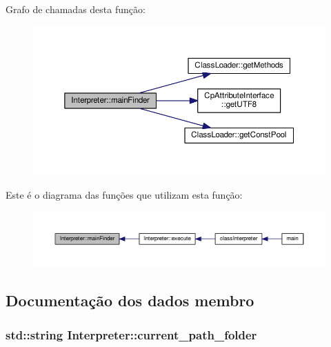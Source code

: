 Grafo de chamadas desta função\+:
\nopagebreak
\begin{figure}[H]
\begin{center}
\leavevmode
\includegraphics[width=350pt]{class_interpreter_a9be1f0faf7df7c81dc180da22ea08fa5_cgraph}
\end{center}
\end{figure}




Este é o diagrama das funções que utilizam esta função\+:
\nopagebreak
\begin{figure}[H]
\begin{center}
\leavevmode
\includegraphics[width=350pt]{class_interpreter_a9be1f0faf7df7c81dc180da22ea08fa5_icgraph}
\end{center}
\end{figure}




\subsection{Documentação dos dados membro}
\subsubsection[{\texorpdfstring{current\+\_\+path\+\_\+folder}{current_path_folder}}]{\setlength{\rightskip}{0pt plus 5cm}std\+::string Interpreter\+::current\+\_\+path\+\_\+folder}\hypertarget{class_interpreter_aba201f836cc30ebda2cdab362e00a145}{}\label{class_interpreter_aba201f836cc30ebda2cdab362e00a145}
